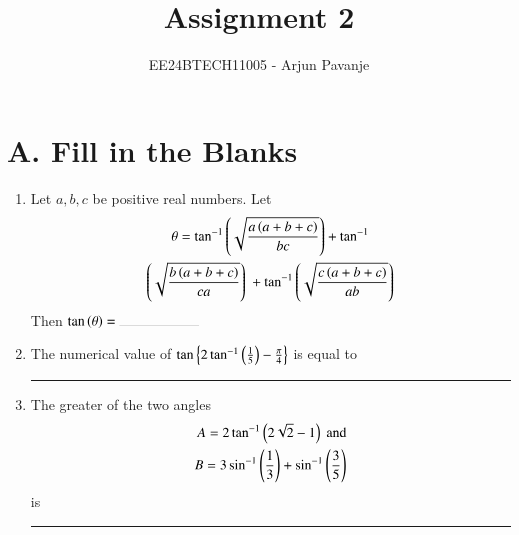 \documentclass[journal,12pt,twocolumn,article]{IEEEtran}
\theoremstyle{remark}
\begin{document}

\vspace{3cm}

\title{Assignment 2}
\author{EE24BTECH11005 - Arjun Pavanje}
\maketitle
\newpage
\bigskip

\renewcommand{\thefigure}{\theenumi}
\renewcommand{\thetable}{\theenumi}
\section*{A. Fill in the Blanks}
\begin{enumerate}
\item Let $a,b,c$ be positive real numbers. Let
\begin{multline*}
	\theta = \tan ^{-1}\left(\sqrt{\frac{a\left(a+b+c\right)}{bc}}\right) + \tan ^{-1}\\\left(\sqrt{\frac{b\left(a+b+c\right)}{ca}}\right)\ + \tan ^{-1}\left(\sqrt{\frac{c\left(a+b+c\right)}{ab}}\right) 
\end{multline*}
Then $\tan \brak{\theta}= \rule{2cm}{0.1pt}$ 
\hfill {}
\item The numerical value of $\tan \left\{ 2\tan ^{-1}\left(\frac{1}{5}\right)-\frac{\pi}{4}\right\}$ is equal to \rule{2cm}{0.1pt}
\hfill {}
\item The greater of the two angles 
\begin{align*}
	A = 2 \tan ^{-1}\left(2\sqrt{2}-1\right) \text{ and}\\
B = 3\sin ^{-1}\left(\frac{1}{3}\right) + \sin ^{-1}\left(\frac{3}{5}\right)
\end{align*}
is \rule{2cm}{0.1pt}
\hfill {}
\end{enumerate}
\end{document}
